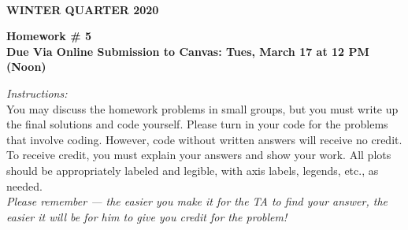 \documentclass[12pt]{article}
\begin{document}
\\
{\bf WINTER QUARTER 2020}\\


\vspace{5mm}

\begin{center}
{\bf Homework \# 5}\\
{\bf Due Via Online Submission to Canvas: Tues, March 17 at 12 PM (Noon) }
\end{center}
\vspace{10mm}

\noindent \emph{Instructions:}\\

 You may discuss the homework problems in small groups, but you must write up the final solutions and code yourself. 
Please turn in your code for the problems that involve coding.  However, code without written answers will receive no credit. To receive credit, you must explain your answers and show your work. All plots should be appropriately labeled and legible, with axis labels, legends, etc., as needed. \\

\emph{Please remember --- the easier you make it for the TA to find your answer, the easier it will be for him to give you credit for the problem!} \\


\vspace{10mm}
\end{document}
